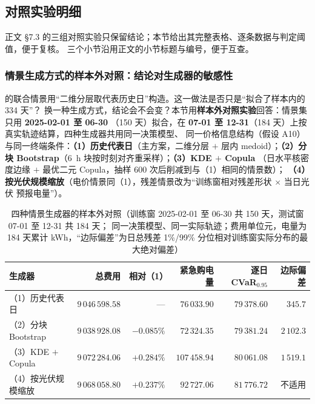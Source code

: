 \subsection{对照实验明细}\label{sec:ctl-app}

正文 \S7.3 的三组对照实验只保留结论；本节给出其完整表格、逐条数据与判定阈值，便于复核。
三个小节沿用正文的小节标题与编号，便于互查。

\subsubsection{情景生成方式的样本外对照：结论对生成器的敏感性}
\label{sec:q4-gen}

 的联合情景用“二维分层取代表历史日”构造。这一做法是否只是“拟合了样本内的 334 天”？
换一种生成方式，结论会不会变？本节用\textbf{样本外对照实验}回答：情景集只用 \textbf{2025-02-01 至 06-30}
（150 天）拟合，在 \textbf{07-01 至 12-31}（184 天）上按真实轨迹结算，四种生成器共用同一决策模型、
同一价格信息结构（假设 A10）与同一终端条件：\textbf{（1）历史代表日}（主方案，二维分层 \(+\) 层内
medoid）；\textbf{（2）分块 Bootstrap}（6~h 块按时刻对齐重采样）；\textbf{（3）KDE \(+\) Copula}
（日水平核密度边缘 \(+\) 最优二元 Copula，抽样 600 次后削减到与（1）相同的情景数）；
\textbf{（4）按光伏规模缩放}（电价情景同（1），残差情景改为“训练窗相对残差形状 \(\times\) 当日光伏
预报电量”）。

\begin{table}[htbp]
  \centering
  \caption{四种情景生成器的样本外对照（训练窗 2025-02-01 至 06-30 共 150 天，测试窗 07-01 至 12-31 共 184 天；
           同一决策模型、同一实际轨迹；费用单位元，电量为 184 天累计 kWh，“边际偏差”为日总残差
           1\%/99\% 分位相对训练窗实际分布的最大绝对偏差）}
  \label{tab:gen-cmp}
  \small
  \begin{tabular}{lrrrrr}
    \toprule
    生成器 & 总费用 & 相对（1） & 紧急购电量 & 逐日 CVaR$_{0.95}$ & 边际偏差 \\
    \midrule
    （1）历史代表日 & $9\,046\,598.58$ & — & $76\,033.90$ & $79\,378.60$ & $345.7$ \\
    （2）分块 Bootstrap & $9\,038\,928.08$ & $-0.085\%$ & $72\,324.35$ & $79\,381.24$ & $2\,102.3$ \\
    （3）KDE $+$ Copula & $9\,072\,284.06$ & $+0.284\%$ & $107\,458.94$ & $80\,061.08$ & $1\,519.1$ \\
    （4）按光伏规模缩放 & $9\,068\,058.80$ & $+0.237\%$ & $92\,727.06$ & $81\,776.72$ & 不适用 \\
    \bottomrule
  \end{tabular}
\end{table}

